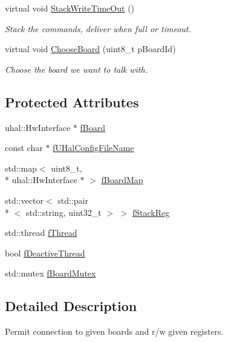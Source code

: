 \begin{DoxyCompactItemize}
virtual void \hyperlink{class_ph2___hw_interface_1_1_reg_manager_ab4e24cf318772c09a6c7e24b88b1dedb}{Stack\-Write\-Time\-Out} ()
\begin{DoxyCompactList}\small\item\em Stack the commands, deliver when full or timeout. \end{DoxyCompactList}\item 
virtual void \hyperlink{class_ph2___hw_interface_1_1_reg_manager_a20c502bcad5115c6ae16d4d356b72f0c}{Choose\-Board} (uint8\-\_\-t p\-Board\-Id)
\begin{DoxyCompactList}\small\item\em Choose the board we want to talk with. \end{DoxyCompactList}\end{DoxyCompactItemize}
\subsection*{Protected Attributes}
\begin{DoxyCompactItemize}
\item 
uhal\-::\-Hw\-Interface $\ast$ \hyperlink{class_ph2___hw_interface_1_1_reg_manager_a0d4908ec834a3a0b7d8139872fd0a4a0}{f\-Board}
\item 
const char $\ast$ \hyperlink{class_ph2___hw_interface_1_1_reg_manager_aaaa29ca65c283acc645132c7bef0f24f}{f\-U\-Hal\-Config\-File\-Name}
\item 
std\-::map$<$ uint8\-\_\-t, \\*
uhal\-::\-Hw\-Interface $\ast$ $>$ \hyperlink{class_ph2___hw_interface_1_1_reg_manager_a9c34ffe467a572796c05036533bb6d39}{f\-Board\-Map}
\item 
std\-::vector$<$ std\-::pair\\*
$<$ std\-::string, uint32\-\_\-t $>$ $>$ \hyperlink{class_ph2___hw_interface_1_1_reg_manager_a382c1c2373fde66d98a44e4aa0208e81}{f\-Stack\-Reg}
\item 
std\-::thread \hyperlink{class_ph2___hw_interface_1_1_reg_manager_a3aa2f1c4769f122a2e902f2d70865b30}{f\-Thread}
\item 
bool \hyperlink{class_ph2___hw_interface_1_1_reg_manager_ae337041a55b10db74bbd8e171424807a}{f\-Deactive\-Thread}
\item 
std\-::mutex \hyperlink{class_ph2___hw_interface_1_1_reg_manager_ab5fdbe722820897d3a1344f300cc4a92}{f\-Board\-Mutex}
\end{DoxyCompactItemize}


\subsection{Detailed Description}
Permit connection to given boards and r/w given registers. 

